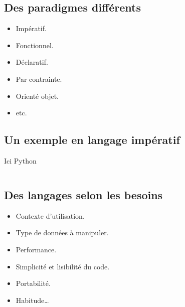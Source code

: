 \subsection{Des paradigmes différents}
\begin{slide}
	\begin{itemize}
		\item Impératif.
		\item Fonctionnel.
		\item Déclaratif.
		\item Par contrainte.
		\item Orienté objet.
		\item etc.
	\end{itemize}
\end{slide}

\subsection{Un exemple en langage impératif}
\begin{slide}
	\begin{exampleblock}{Ici Python}
		\inputminted{python}{exemples-manipulation/python.py}
	\end{exampleblock}
\end{slide}

\subsection{Des langages selon les besoins}
\begin{slide}
	\begin{itemize}
		\item Contexte d'utilisation.
		\item Type de données à manipuler.
		\item Performance.
		\item Simplicité et lisibilité du code.
		\item Portabilité.
		\item Habitude… 
	\end{itemize}
\end{slide}

